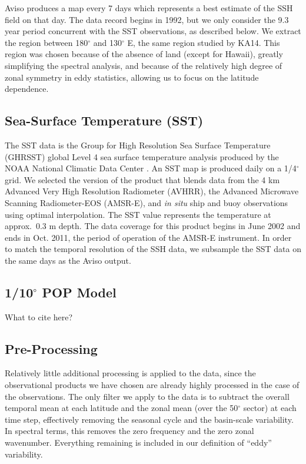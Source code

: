 \documentclass[10pt]{article}
\begin{document}
Aviso produces a map every 7 days which represents a best estimate of the SSH field on that day. The data record begins in 1992, but we only consider the 9.3 year period concurrent with the SST observations, as described below. We extract the region between 180$^\circ$ and 130$^\circ$ E, the same region studied by KA14. This region was chosen because of the absence of land (except for Hawaii), greatly simplifying the spectral analysis, and because of the relatively high degree of zonal symmetry in eddy statistics, allowing us to focus on the latitude dependence.

\subsection{Sea-Surface Temperature (SST)}

The SST data is the Group for High Resolution Sea Surface Temperature (GHRSST) global Level 4 sea surface temperature analysis produced by the NOAA National Climatic Data Center \citep{ReynoldsEtAl2007}. An SST map is produced daily on a 1/4$^\circ$ grid. We selected the version of the product that blends data from the 4 km Advanced Very High Resolution Radiometer (AVHRR), the Advanced Microwave Scanning Radiometer-EOS (AMSR-E), and {\em in situ} ship and buoy observations using optimal interpolation. The SST value represents the temperature at approx.~0.3 m depth. The data coverage for this product begins in June 2002 and ends in Oct. 2011, the period of operation of the AMSR-E instrument. In order to match the temporal resolution of the SSH data, we subsample the SST data on the same days as the Aviso output.

\subsection{1/10$^\circ$ POP Model}

What to cite here?

\subsection{Pre-Processing}

Relatively little additional processing is applied to the data, since the observational products we have chosen are already highly processed in the case of the observations. The only filter we apply to the data is to subtract the overall temporal mean at each latitude and the zonal mean (over the 50$^\circ$ sector) at each time step, effectively removing the seasonal cycle and the basin-scale variability. In spectral terms, this removes the zero frequency and the zero zonal wavenumber. Everything remaining is included in our definition of ``eddy'' variability.
\end{document}
